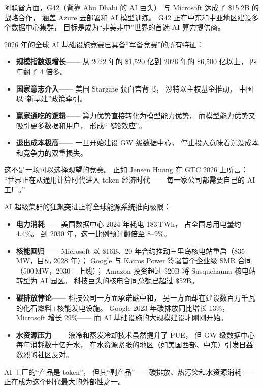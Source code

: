 阿联酋方面，G42（背靠 Abu Dhabi 的 AI 巨头）
与 Microsoft 达成了 \$15.2B 的战略合作，
涵盖 Azure 云部署和 AI 模型训练。
G42 正在中东和中亚地区建设多个数据中心集群，
目标是成为``非美非中''世界的首选 AI 算力提供商。


\begin{corebox}
2026 年的全球 AI 基础设施竞赛已具备``军备竞赛''的所有特征：
\begin{itemize}[noitemsep]
  \item \textbf{规模指数级增长}——
        从 2022 年的 \$1,520 亿到 2026 年的 \$6,500 亿以上，
        四年翻了 4 倍多。
  \item \textbf{国家意志介入}——
        美国 Stargate 获白宫背书，
        沙特以主权基金推动，
        中国以``新基建''政策牵引。
  \item \textbf{赢家通吃的逻辑}——
        算力优势直接转化为模型能力优势，
        而模型能力优势又吸引更多数据和用户，
        形成``飞轮效应''。
  \item \textbf{退出成本极高}——
        一旦开始建设 GW 级数据中心，
        停止投入意味着沉没成本和竞争力的双重损失。
\end{itemize}
这不是一场可以选择观望的竞赛。
正如 Jensen Huang 在 GTC 2026 上所言：
``世界正在从通用计算时代进入 token 经济时代——
每一家公司都需要自己的 AI 工厂。''
\end{corebox}


\begin{warnbox}
AI 超级集群的狂飙突进正将全球能源系统推向极限：

\begin{itemize}[noitemsep]
  \item \textbf{电力消耗}——
        美国数据中心 2024 年耗电 183\,TWh，
        占全国总用电量约 4.4\%。
        到 2030 年，这一比例预计翻倍至 8--9\%。
  \item \textbf{核能回归}——
        Microsoft 以 \$16B、20 年合约推动三里岛核电站重启（835\,MW，目标 2028 年）；
        Google 与 Kairos Power 签署首个企业级 SMR 合同（500\,MW，2030+ 上线）；
        Amazon 投资超过 \$20B 将 Susquehanna 核电站转型为 AI 园区。
        科技巨头的核电合同总额已超过 \$52B。
  \item \textbf{碳排放悖论}——
        科技公司一方面承诺碳中和，
        另一方面却在建设数百万千瓦的化石燃料+核能发电设施。
        Google 2023 年碳排放同比增长 13\%，
        Microsoft 增长 29\%——
        而 AI 基础设施的大规模建设才刚刚开始。
  \item \textbf{水资源压力}——
        液冷和蒸发冷却技术虽然提升了 PUE，
        但 GW 级数据中心每年消耗数十亿升水，
        在水资源紧张的地区（如美国西部、中东）引发日益激烈的社区反对。
\end{itemize}

AI 工厂的``产品是 token''，
但其``副产品''——碳排放、热污染和水资源消耗——
正在成为这个时代最大的外部性之一。
\end{warnbox}

